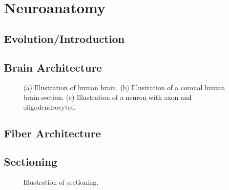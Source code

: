 \setcounter{chapter}{2}
\chapter{Neuroanatomy}
\label{sec:neuro}
%
%
\section{Evolution/Introduction}
%
\section{Brain Architecture}
%
\begin{figure}[!tb]
	\centering
	\caption{(a) Illustration of human brain. (b) Illustration of a coronal human brain section. (c) Illustration of a neuron with axon and oligodendrocytes.}
	\label{fig::human-brain}
\end{figure}
%
\section{Fiber Architecture}
%
\section{Sectioning}
%
\begin{figure}[!tb]
	\centering
	\caption{Illustration of sectioning.}
	\label{fig::brain_sectioning}
\end{figure}
%
